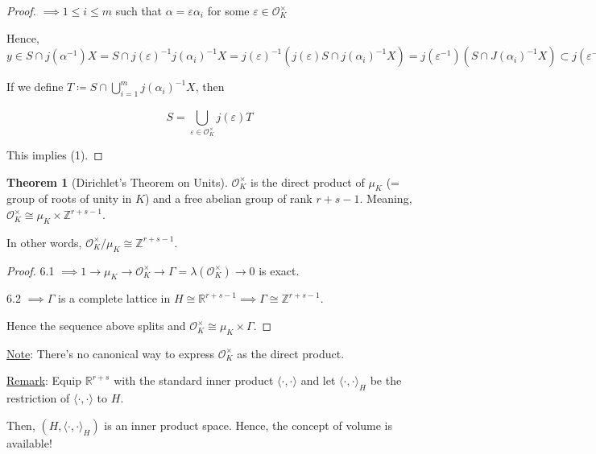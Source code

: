 \documentclass[openany]{amsbook}
\numberwithin{section}{chapter}
\theoremstyle{definition}
\newtheorem{theorem}{Theorem}[chapter]
\begin{document}
\begin{proof}
    \(\implies 1 \leq i \leq m\) such that \(\alpha = \varepsilon \alpha_i\) for some \(\varepsilon \in \mathcal{O}_K ^ \times\)
    
    Hence, \(y\in S \cap j (\alpha^{-1}) X = S \cap j(\varepsilon)^{-1} j(\alpha_i)^{-1} X = j(\varepsilon)^{-1} \left( j(\varepsilon) S \cap j(\alpha_i)^{-1} X \right) = j(\varepsilon ^{-1}) (S \cap J(\alpha_i)^{-1} X) \subset j(\varepsilon ^{-1}) \cdot \left( S \cap \bigcup_{i=1}^{m} j(\alpha_i)^{-1} X \right)  \) 

    If we define \(T \coloneqq S\cap \bigcup_{i=1}^{m} j(\alpha_i)^{-1} X\), then
    
    \[
        S = \bigcup_{\varepsilon \in \mathcal{O}_K^\times}^{} j(\varepsilon) T
    \]

    This implies (1).

\end{proof}

\begin{theorem}
    [Dirichlet's Theorem on Units] \(\mathcal{O}_K^\times\) is the direct product of \(\mu_K\) (= group of roots of unity in \(K\)) and a free abelian group of rank \(r + s - 1\). Meaning, \(\mathcal{O}_K ^\times \cong \mu_K \times \mathbb{Z}^{r+s-1}\). 

    In other words, \(\mathcal{O}_K ^\times / \mu_K \cong \mathbb{Z}^{r+s-1}\).
\end{theorem}

\begin{proof}
    6.1 \(\implies 1 \to \mu_K \to \mathcal{O}_K^\times \to \Gamma = \lambda(\mathcal{O}_K^\times) \to 0\) is exact.

    6.2 \(\implies \Gamma\) is a complete lattice in \(H \cong \mathbb{R}^{r+s-1} \implies \Gamma \cong \mathbb{Z} ^{r+s-1}\).

    Hence the sequence above splits and \(\mathcal{O}_K^\times \cong \mu_K \times \Gamma\).
\end{proof}

\underline{Note}: There's no canonical way to express \(\mathcal{O}_K^\times\) as the direct product.

\underline{Remark}: Equip \(\mathbb{R}^{r+s}\) with the standard inner product \(\langle \cdot , \cdot \rangle\) and let \(\langle \cdot,\cdot \rangle_H\) be the restriction of \(\langle \cdot,\cdot \rangle\) to \(H\).

Then, \((H,\langle \cdot,\cdot \rangle_H)\) is an inner product space. Hence, the concept of volume is available!
\end{document}
